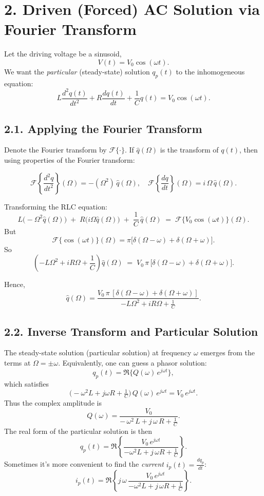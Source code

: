 \documentclass{article}
\begin{document}
\section*{2. Driven (Forced) AC Solution via Fourier Transform}

\noindent Let the driving voltage be a sinusoid,
\[
V(t) = V_0 \cos(\omega t).
\]
We want the \textit{particular} (steady-state) solution $q_p(t)$ to the inhomogeneous equation:
\[
L \frac{d^2 q(t)}{dt^2} + R \frac{d q(t)}{dt} + \frac{1}{C} q(t) = V_0 \cos(\omega t).
\]

\subsection*{2.1. Applying the Fourier Transform}

\noindent Denote the Fourier transform by $\mathcal{F}\{ \cdot \}$. If $\hat{q}(\Omega)$ is the transform of $q(t)$, then using properties of the Fourier transform:

\[
\mathcal{F}\left\{ \frac{d^2 q}{dt^2} \right\}(\Omega) = -( \Omega^2 ) \,\hat{q}(\Omega), 
\quad
\mathcal{F}\left\{ \frac{d q}{dt} \right\}(\Omega) = i\,\Omega \,\hat{q}(\Omega).
\]

\noindent Transforming the RLC equation:
\[
L\bigl(-\Omega^2 \hat{q}(\Omega)\bigr) \;+\; R \bigl(i\Omega \hat{q}(\Omega)\bigr) \;+\; \frac{1}{C} \,\hat{q}(\Omega) 
\;=\; \mathcal{F}\{V_0 \cos(\omega t)\}(\Omega).
\]
But 
\[
\mathcal{F}\{\cos(\omega t)\}(\Omega) = \pi \bigl[\delta(\Omega - \omega) + \delta(\Omega + \omega)\bigr].
\]
So
\[
\left(-L \Omega^2 + iR\Omega + \frac{1}{C}\right)\hat{q}(\Omega) 
\;=\; V_0\,\pi \,\bigl[\delta(\Omega - \omega) + \delta(\Omega + \omega)\bigr].
\]

\noindent Hence,
\[
\hat{q}(\Omega) = \frac{V_0\,\pi\,[\delta(\Omega - \omega) + \delta(\Omega + \omega)]}{-L \Omega^2 + iR\Omega + \tfrac{1}{C}}.
\]

\subsection*{2.2. Inverse Transform and Particular Solution}

\noindent The steady-state solution (particular solution) at frequency $\omega$ emerges from the terms at $\Omega = \pm \omega$. Equivalently, one can guess a phasor solution:
\[
q_p(t) = \Re\Big\{ Q(\omega)\, e^{j \omega t} \Big\}, 
\]
which satisfies
\[
\bigl(-\omega^2 L + j\omega R + \tfrac{1}{C}\bigr)\,Q(\omega)\,e^{j\omega t} = V_0\,e^{j\omega t}.
\]
Thus the complex amplitude is
\[
Q(\omega) = \frac{V_0}{-\,\omega^2\,L + j\,\omega\,R + \tfrac{1}{C}}.
\]
The real form of the particular solution is then
\[
q_p(t) = \Re\left\{ \frac{V_0 \, e^{j\omega t}}{-\omega^2 L + j\,\omega R + \tfrac{1}{C}} \right\}.
\]
Sometimes it's more convenient to find the \textit{current} $i_p(t) = \frac{d q_p}{dt}$:
\[
i_p(t) = \Re\left\{ j\,\omega \,\frac{V_0 \, e^{j\omega t}}{-\omega^2 L + j\,\omega R + \tfrac{1}{C}} \right\}.
\]
\end{document}
